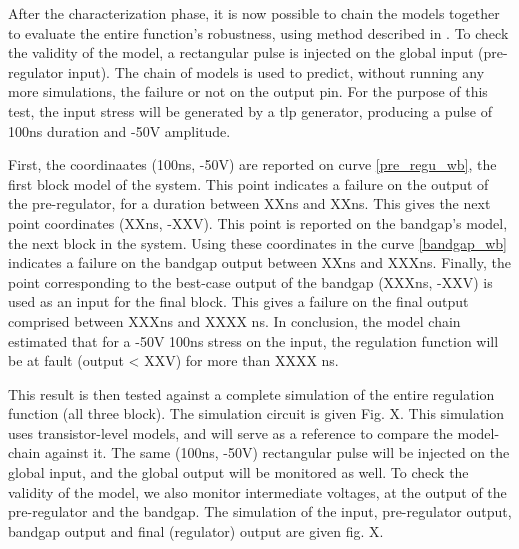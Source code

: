 
After the characterization phase, it is now possible to chain the models together to evaluate the entire function's robustness, using method described in \label{sec:block-chaining}.
To check the validity of the model, a rectangular pulse is injected on the global input (pre-regulator input).
The chain of models is used to predict, without running any more simulations, the failure or not on the output pin.
For the purpose of this test, the input stress will be generated by a \gls{tlp} generator, producing a pulse of 100ns duration and -50V amplitude.

First, the coordinaates (100ns, -50V) are reported on curve \ref{pre_regu_wb}, the first block model of the system.
This point indicates a failure on the output of the pre-regulator, for a duration between XXns and XXns.
This gives the next point coordinates (XXns, -XXV).
This point is reported on the bandgap's model, the next block in the system.
Using these coordinates in the curve \ref{bandgap_wb} indicates a failure on the bandgap output between XXns and XXXns.
Finally, the point corresponding to the best-case output of the bandgap (XXXns, -XXV) is used as an input for the final block.
This gives a failure on the final output comprised between XXXns and XXXX ns.
In conclusion, the model chain estimated that for a -50V 100ns stress on the input, the regulation function will be at fault (output < XXV) for more than XXXX ns.


This result is then tested against a complete simulation of the entire regulation function (all three block).
The simulation circuit is given Fig. X.
This simulation uses transistor-level models, and will serve as a reference to compare the model-chain against it.
The same (100ns, -50V) rectangular pulse will be injected on the global input, and the global output will be monitored as well.
To check the validity of the model, we also monitor intermediate voltages, at the output of the pre-regulator and the bandgap.
The simulation of the input, pre-regulator output, bandgap output and final (regulator) output are given fig. X.



